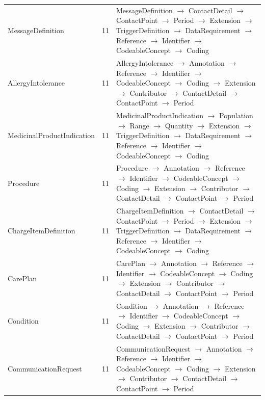 \begin{longtable}{lrl}
MessageDefinition & 11 & MessageDefinition $\rightarrow$ ContactDetail $\rightarrow$ ContactPoint $\rightarrow$ Period $\rightarrow$ Extension $\rightarrow$ TriggerDefinition $\rightarrow$ DataRequirement $\rightarrow$ Reference $\rightarrow$ Identifier $\rightarrow$ CodeableConcept $\rightarrow$ Coding \\
AllergyIntolerance & 11 & AllergyIntolerance $\rightarrow$ Annotation $\rightarrow$ Reference $\rightarrow$ Identifier $\rightarrow$ CodeableConcept $\rightarrow$ Coding $\rightarrow$ Extension $\rightarrow$ Contributor $\rightarrow$ ContactDetail $\rightarrow$ ContactPoint $\rightarrow$ Period \\
MedicinalProductIndication & 11 & MedicinalProductIndication $\rightarrow$ Population $\rightarrow$ Range $\rightarrow$ Quantity $\rightarrow$ Extension $\rightarrow$ TriggerDefinition $\rightarrow$ DataRequirement $\rightarrow$ Reference $\rightarrow$ Identifier $\rightarrow$ CodeableConcept $\rightarrow$ Coding \\
Procedure & 11 & Procedure $\rightarrow$ Annotation $\rightarrow$ Reference $\rightarrow$ Identifier $\rightarrow$ CodeableConcept $\rightarrow$ Coding $\rightarrow$ Extension $\rightarrow$ Contributor $\rightarrow$ ContactDetail $\rightarrow$ ContactPoint $\rightarrow$ Period \\
ChargeItemDefinition & 11 & ChargeItemDefinition $\rightarrow$ ContactDetail $\rightarrow$ ContactPoint $\rightarrow$ Period $\rightarrow$ Extension $\rightarrow$ TriggerDefinition $\rightarrow$ DataRequirement $\rightarrow$ Reference $\rightarrow$ Identifier $\rightarrow$ CodeableConcept $\rightarrow$ Coding \\
CarePlan & 11 & CarePlan $\rightarrow$ Annotation $\rightarrow$ Reference $\rightarrow$ Identifier $\rightarrow$ CodeableConcept $\rightarrow$ Coding $\rightarrow$ Extension $\rightarrow$ Contributor $\rightarrow$ ContactDetail $\rightarrow$ ContactPoint $\rightarrow$ Period \\
Condition & 11 & Condition $\rightarrow$ Annotation $\rightarrow$ Reference $\rightarrow$ Identifier $\rightarrow$ CodeableConcept $\rightarrow$ Coding $\rightarrow$ Extension $\rightarrow$ Contributor $\rightarrow$ ContactDetail $\rightarrow$ ContactPoint $\rightarrow$ Period \\
CommunicationRequest & 11 & CommunicationRequest $\rightarrow$ Annotation $\rightarrow$ Reference $\rightarrow$ Identifier $\rightarrow$ CodeableConcept $\rightarrow$ Coding $\rightarrow$ Extension $\rightarrow$ Contributor $\rightarrow$ ContactDetail $\rightarrow$ ContactPoint $\rightarrow$ Period \\

\end{longtable}
